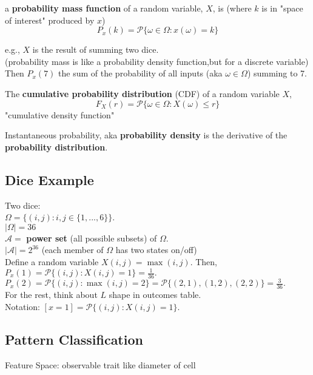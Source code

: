 \documentclass[12pt]{article}
\begin{document}
\noindent a \textbf{probability mass function}  of a random variable, $X$, is
(where $k$ is in "space of interest" produced by $x$)
$$P_x(k) = \mathcal{P} \{ \omega \in \Omega : x(\omega) = k\}$$

e.g., $X$ is the result of summing two dice. \\
(probability mass is like a probability density function,but for a discrete variable)\\

Then $P_x(7)$ the sum of the probability of all inputs (aka $\omega \in \Omega$) summing to 7.


The \textbf{cumulative probability distribution} (CDF) of a random variable $X$,
$$F_X(r) = \mathcal{P} \{ \omega \in \Omega : X(\omega) \leq r\}$$
"cumulative density function"

Instantaneous probability, aka \textbf{probability density} is the derivative of the \textbf{probability distribution}.

\subsection*{Dice Example}
Two dice: \\
$\Omega = \{(i, j) : i, j \in \{1,..., 6\}\}$.\\
\indent $|\Omega| = 36$\\
$\mathcal{A} =$ \textbf{power set} (all possible subsets) of $\Omega$.\\
\indent $|\mathcal{A}| = 2^{36}$ (each member of $\Omega$ has two states on/off)\\

Define a random variable $X(i,j) = \max(i, j)$. Then, \\
$P_x(1) = \mathcal{P} \{(i, j): X(i, j) = 1\} = \frac{1}{36}.$\\
$P_x(2) = \mathcal{P} \{(i, j): \max(i, j) = 2\} = \mathcal{P} \{(2, 1), (1, 2), (2, 2)\} = \frac{3}{36}.$\\

For the rest, think about $L$ shape in outcomes table.\\

Notation: $[ x = 1] =\mathcal{P} \{(i, j): X(i, j) = 1\}$.


\subsection*{Pattern Classification}

Feature Space: observable trait like diameter of cell\\
\end{document}

